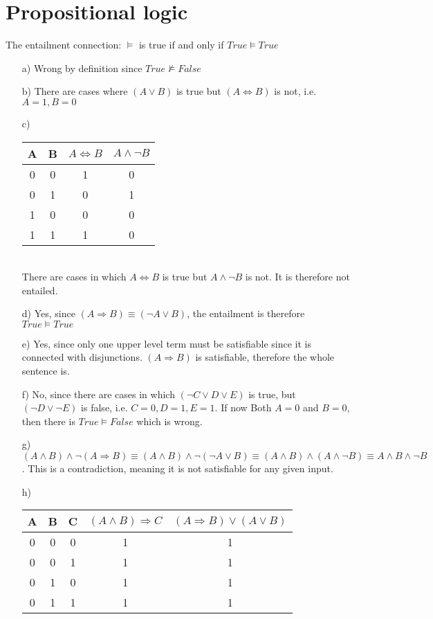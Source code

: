 \documentclass[a4paper]{article}
\begin{document}
\section{Propositional logic}
The entailment connection: $\vDash$ is true if and only if $True \vDash True$
\begin{itemize}
	\item[a)] Wrong by definition since $True \not \vDash False$
	\item[b)] There are cases where $(A \lor B)$ is true but $(A \Leftrightarrow B)$ is not, i.e. $A = 1, B = 0$
	\item[c)] 
	\begin{tabular}{c | c || c | c }
		A & B & $A \Leftrightarrow B$ & $A \land \neg B$ \\ \hline
		0 & 0 & 1 & 0 \\
		0 & 1 & 0 & 1 \\
		1 & 0 & 0 & 0 \\
		1 & 1 & 1 & 0 
	\end{tabular}\\
	There are cases in which $A \Leftrightarrow B$ is true but $A\land \neg B$ is not. It is therefore not entailed.
	\item[d)] Yes, since $(A \Rightarrow B) \equiv (\neg A \lor B)$, the entailment is therefore $True \vDash True$
	\item[e)] Yes, since only one upper level term must be satisfiable since it is connected with disjunctions. $(A \Rightarrow B)$ is satisfiable, therefore the whole sentence is.
	\item[f)] No, since there are cases in which $(\neg C \lor D \lor E)$ is true, but $(\neg D \lor \neg E)$ is false, i.e. $C = 0, D = 1, E = 1$. If now Both $A = 0$ and $B = 0$, then there is $True \vDash False$ which is wrong.
	\item[g)] $(A\land B) \land\neg (A \Rightarrow B) \equiv (A\land B) \land\neg (\neg A \lor B) \equiv (A\land B) \land (A \land  \neg B) \equiv A \land B \land \neg B$. This is a contradiction, meaning it is not satisfiable for any given input.
	\item[h)] \begin{tabular}{c | c | c || c | c }
		A & B & C & $(A \land B) \Rightarrow C$ & $(A \Rightarrow B) \lor (A \lor B)$ \\ \hline
		0 & 0 & 0 & 1 & 1 \\
		0 & 0 & 1 & 1 & 1 \\
		0 & 1 & 0 & 1 & 1 \\
		0 & 1 & 1 & 1 & 1 \\

\end{tabular}
\end{itemize}
\end{document}
